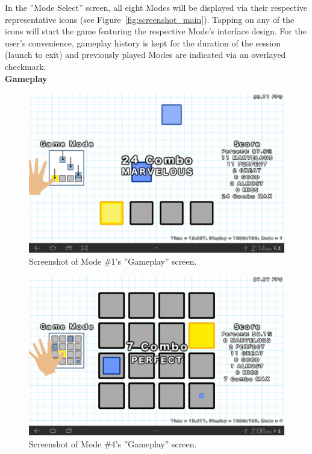 \documentclass{sig-alternate}
\begin{document}
In the ''Mode Select'' screen, all eight Modes will be displayed via their respective representative icons (see Figure~\ref{fig:screenshot_main}). Tapping on any of the icons will start the game featuring the respective Mode's interface design. For the user's convenience, gameplay history is kept for the duration of the session (launch to exit) and previously played Modes are indicated via an overlayed checkmark. \\

\noindent \textbf{Gameplay}

\begin{figure}[htb!]
	\begin{center}
		\includegraphics[width=1\linewidth]{figure_screenshot_gameplay_1}
	\end{center}
	\vspace{-12pt}
	\caption{Screenshot of Mode \#1's ''Gameplay'' screen.}
	\label{fig:screenshot_gameplay_1}
\end{figure}

\begin{figure}[htb!]
	\begin{center}
		\includegraphics[width=1\linewidth]{figure_screenshot_gameplay_4}
	\end{center}
	\vspace{-12pt}
	\caption{Screenshot of Mode \#4's ''Gameplay'' screen.}
	\label{fig:screenshot_gameplay_4}
\end{figure}
\end{document}
